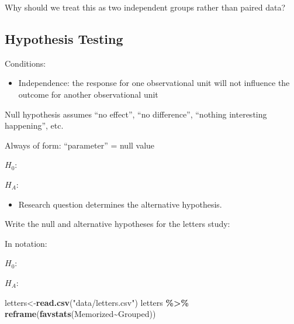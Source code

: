 \documentclass[
]{report}
\newenvironment{Shaded}{\begin{snugshade}}{\end{snugshade}}
\newcommand{\FunctionTok}[1]{\textcolor[rgb]{0.13,0.29,0.53}{\textbf{#1}}}
\newcommand{\NormalTok}[1]{#1}
\newcommand{\OtherTok}[1]{\textcolor[rgb]{0.56,0.35,0.01}{#1}}
\newcommand{\SpecialCharTok}[1]{\textcolor[rgb]{0.81,0.36,0.00}{\textbf{#1}}}
\newcommand{\StringTok}[1]{\textcolor[rgb]{0.31,0.60,0.02}{#1}}
\providecommand{\tightlist}{%
  \setlength{\itemsep}{0pt}\setlength{\parskip}{0pt}}
\newcommand{\rgi}{\hspace{24pt}}  %
\begin{document}

Why should we treat this as two independent groups rather than paired data?

\vspace{0.6in}

\subsection*{Hypothesis Testing}\label{hypothesis-testing-8}

Conditions:

\begin{itemize}
\tightlist
\item
  Independence: the response for one observational unit will not influence the outcome for another observational unit
\end{itemize}

Null hypothesis assumes ``no effect'', ``no difference'', ``nothing interesting happening'', etc.

\rgi Always of form: ``parameter'' = null value

\(H_0:\)

\vspace{0.5in}

\(H_A:\)

\vspace{0.5in}

\begin{itemize}
\tightlist
\item
  Research question determines the alternative hypothesis.
\end{itemize}

Write the null and alternative hypotheses for the letters study:

In notation:

\(H_0:\)

\vspace{0.2in}

\(H_A:\)

\vspace{0.2in}

\begin{Shaded}
\begin{Highlighting}[]
\NormalTok{letters}\OtherTok{\textless{}{-}}\FunctionTok{read.csv}\NormalTok{(}\StringTok{"data/letters.csv"}\NormalTok{)}
\NormalTok{letters }\SpecialCharTok{\%\textgreater{}\%}
    \FunctionTok{reframe}\NormalTok{(}\FunctionTok{favstats}\NormalTok{(Memorized}\SpecialCharTok{\textasciitilde{}}\NormalTok{Grouped))}
\end{Highlighting}
\end{Shaded}
\end{document}
